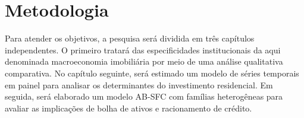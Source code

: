 \section{Metodologia}\label{passos}

Para atender os objetivos, a pesquisa será dividida em três capítulos independentes.
O primeiro tratará das especificidades institucionais da aqui denominada macroeconomia imobiliária por meio de uma análise qualitativa comparativa.
No capítulo seguinte, será estimado um modelo de séries temporais em painel para analisar os determinantes do investimento residencial.
Em seguida, será elaborado um modelo AB-SFC com famílias heterogêneas para avaliar as implicações de bolha de ativos e racionamento de crédito.

